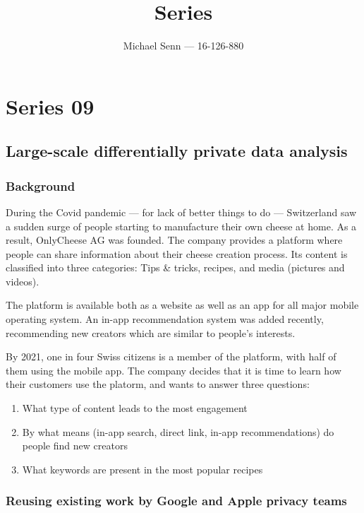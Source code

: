 \documentclass[a4paper]{scrreprt}
\title{Series \series}
\author{Michael Senn \maillink{michael.senn@students.unibe.ch} --- 16-126-880}
\date{\printdate}
\newcommand{\series}{09}
\begin{document}
\maketitle


\setcounter{chapter}{\numexpr \series - 1 \relax}

\chapter{Series \series}

\section{Large-scale differentially private data analysis}

\subsection{Background}

During the Covid pandemic --- for lack of better things to do --- Switzerland
saw a sudden surge of people starting to manufacture their own cheese at home.
As a result, OnlyCheese AG was founded. The company provides a platform where
people can share information about their cheese creation process. Its content
is classified into three categories: Tips \& tricks, recipes, and media
(pictures and videos).

The platform is available both as a website as well as an app for all major
mobile operating system. An in-app recommendation system was added recently,
recommending new creators which are similar to people's interests.

By 2021, one in four Swiss citizens is a member of the platform, with half of
them using the mobile app. The company decides that it is time to learn how
their customers use the platorm, and wants to answer three questions:
\begin{enumerate}
		\item What type of content leads to the most engagement
		\item By what means (in-app search, direct link, in-app
				recommendations) do people find new creators
		\item What keywords are present in the most popular recipes
\end{enumerate}

\subsection{Reusing existing work by Google and Apple privacy teams}
\end{document}
